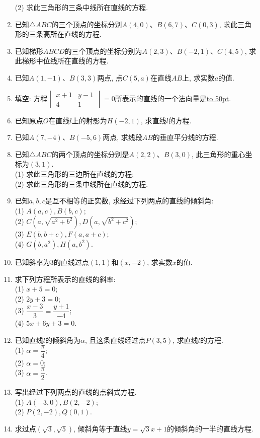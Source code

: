 \documentclass[10pt,a4paper]{article}
\newcommand{\blank}[1]{\underline{\hbox to #1pt{}}}
\begin{document}
\begin{enumerate}[1.]
(2) 求此三角形的三条中线所在直线的方程.
\item 已知$\triangle ABC$的三个顶点的坐标分别$A(4,0)$、$B(6,7)$、$C(0,3)$, 求此三角形的三条高所在直线的方程.
\item 已知梯形$ABCD$的三个顶点的坐标分别为$A(2,3)$、$B(-2,1)$、$C(4,5)$, 求此梯形中位线所在直线的方程.
\item 已知$A(1,-1)$、$B(3,3)$两点, 点$C(5,a)$在直线$AB$上, 求实数$a$的值.
\item 填空:
方程$\begin{vmatrix} x+1 & y-1  \\4 & 1  \end{vmatrix}=0$所表示的直线的一个法向量是\blank{50}.
\item 已知原点$O$在直线$l$上的射影为$H(-2,1)$, 求直线$l$的方程.
\item 已知$A(7,-4)$、$B(-5,6)$两点, 求线段$AB$的垂直平分线的方程.
\item 已知$\triangle ABC$的两个顶点的坐标分别是$A(2,2)$、$B(3,0)$, 此三角形的重心坐标为$(3,1)$.\\
(1) 求此三角形的三边所在直线的方程;\\
(2) 求此三角形的三条中线所在直线的方程.
\item 已知$a,b,c$是互不相等的正实数, 求经过下列两点的直线的倾斜角:\\
(1) $A(a,c),B(b,c)$;\\
(2) $C(a,\sqrt {a^2+b^2}),D(a,\sqrt {b^2+c^2})$;\\
(3) $E(b,b+c),F(a,a+c)$;\\
(4) $G(b,a^2),H(a,b^2)$.
\item 已知斜率为$3$的直线过点$(1,1)$和$(x,-2)$, 求实数$x$的值.
\item 求下列方程所表示的直线的斜率:\\
(1) $x+5=0$;\\
(2) $2y+3=0$;\\
(3) $\dfrac{x-3}3=\dfrac{y+1}{-4}$;\\
(4) $5x+6y+3=0$.
\item 已知直线$l$的倾斜角为$\alpha$, 且这条直线经过点$P(3,5)$, 求直线$l$的方程.\\
(1) $\alpha =\dfrac{\pi }4$;\\ 
(2) $\alpha =0$;\\
(3) $\alpha =\dfrac{\pi}2$.
\item 写出经过下列两点的直线的点斜式方程.\\
(1) $A(-3,0),B(2,-2)$;\\ 
(2) $P(2,-2),Q(0,1)$.
\item 求过点$(\sqrt 3,\sqrt 5)$, 倾斜角等于直线$y=\sqrt 3x+1$的倾斜角的一半的直线方程.

\end{enumerate}
\end{document}
